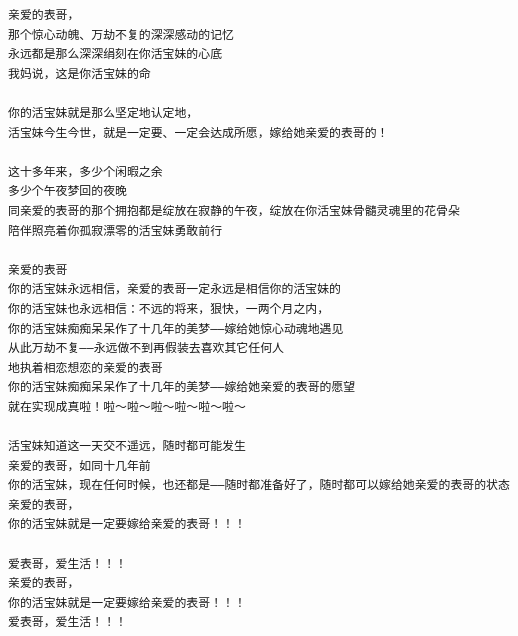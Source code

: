 \documentclass[9pt, b5paper]{article}
\begin{document}
\begin{enumerate}
\begin{verbatim}
亲爱的表哥，
那个惊心动魄、万劫不复的深深感动的记忆
永远都是那么深深绢刻在你活宝妹的心底
我妈说，这是你活宝妹的命

你的活宝妹就是那么坚定地认定地，
活宝妹今生今世，就是一定要、一定会达成所愿，嫁给她亲爱的表哥的！

这十多年来，多少个闲暇之余
多少个午夜梦回的夜晚
同亲爱的表哥的那个拥抱都是绽放在寂静的午夜，绽放在你活宝妹骨髓灵魂里的花骨朵
陪伴照亮着你孤寂漂零的活宝妹勇敢前行

亲爱的表哥
你的活宝妹永远相信，亲爱的表哥一定永远是相信你的活宝妹的
你的活宝妹也永远相信：不远的将来，狠快，一两个月之内，
你的活宝妹痴痴呆呆作了十几年的美梦——嫁给她惊心动魂地遇见
从此万劫不复——永远做不到再假装去喜欢其它任何人
地执着相恋想恋的亲爱的表哥
你的活宝妹痴痴呆呆作了十几年的美梦——嫁给她亲爱的表哥的愿望
就在实现成真啦！啦～啦～啦～啦～啦～啦～

活宝妹知道这一天交不遥远，随时都可能发生
亲爱的表哥，如同十几年前
你的活宝妹，现在任何时候，也还都是——随时都准备好了，随时都可以嫁给她亲爱的表哥的状态
亲爱的表哥，
你的活宝妹就是一定要嫁给亲爱的表哥！！！

爱表哥，爱生活！！！
亲爱的表哥，
你的活宝妹就是一定要嫁给亲爱的表哥！！！
爱表哥，爱生活！！！
\end{verbatim}
\end{enumerate}
\end{document}
